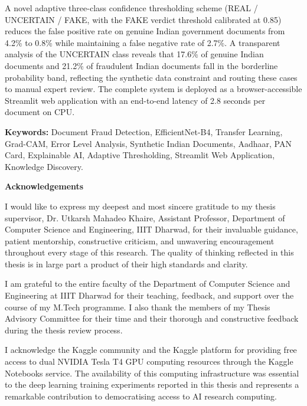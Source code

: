 \documentclass[12pt,a4paper,oneside]{report}
\begin{document}
\vspace{6pt}\noindent A novel adaptive three-class confidence thresholding
scheme (REAL / UNCERTAIN / FAKE, with the FAKE verdict threshold calibrated
at 0.85) reduces the false positive rate on genuine Indian government documents
from 4.2\% to 0.8\% while maintaining a false negative rate of 2.7\%. A
transparent analysis of the UNCERTAIN class reveals that 17.6\% of genuine
Indian documents and 21.2\% of fraudulent Indian documents fall in the
borderline probability band, reflecting the synthetic data constraint and
routing these cases to manual expert review. The complete system is deployed
as a browser-accessible Streamlit web application with an end-to-end latency
of 2.8 seconds per document on CPU.

\vspace{0.6cm}\noindent\textbf{Keywords:} Document Fraud Detection,
EfficientNet-B4, Transfer Learning, Grad-CAM, Error Level Analysis, Synthetic
Indian Documents, Aadhaar, PAN Card, Explainable AI, Adaptive Thresholding,
Streamlit Web Application, Knowledge Discovery.

\newpage\thispagestyle{plain}
\begin{center}{\Large\bfseries Acknowledgements}\end{center}\vspace{0.5cm}

\noindent I would like to express my deepest and most sincere gratitude to my
thesis supervisor, Dr. Utkarsh Mahadeo Khaire, Assistant Professor, Department of Computer
Science and Engineering, IIIT Dharwad, for their invaluable guidance,
patient mentorship, constructive criticism, and unwavering encouragement
throughout every stage of this research. The quality of thinking reflected
in this thesis is in large part a product of their high standards and clarity.

\vspace{6pt}\noindent I am grateful to the entire faculty of the Department of
Computer Science and Engineering at IIIT Dharwad for their teaching, feedback,
and support over the course of my M.Tech programme. I also thank the members
of my Thesis Advisory Committee for their time and their thorough and
constructive feedback during the thesis review process.

\vspace{6pt}\noindent I acknowledge the Kaggle community and the Kaggle
platform for providing free access to dual NVIDIA Tesla T4 GPU computing
resources through the Kaggle Notebooks service. The availability of this
computing infrastructure was essential to the deep learning training
experiments reported in this thesis and represents a remarkable contribution
to democratising access to AI research computing.
\end{document}
